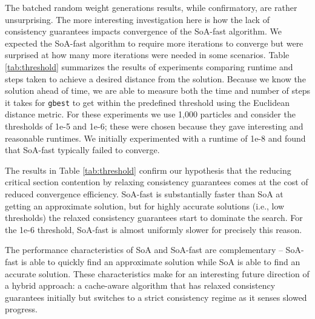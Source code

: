 The batched random weight generations results, while confirmatory, are rather
unsurprising. The more interesting investigation here is how the lack of
consistency guarantees impacts convergence of the SoA-fast algorithm. We
expected the SoA-fast algorithm to require more iterations to converge
but were surprised at how many more iterations were needed in some
scenarios. Table \ref{tab:threshold} summarizes the results of experiments
comparing runtime and steps taken to achieve a desired distance from the
solution. Because we know the solution ahead of time, we are able to measure
both the time and number of steps it
takes for \texttt{gbest} to get within the predefined threshold using the
Euclidean distance metric. For these experiments we use 1,000 particles and
consider the thresholds of 1e-5 and 1e-6; these were chosen because they
gave interesting and reasonable runtimes. We initially experimented with a
runtime of 1e-8 and found that SoA-fast typically failed to converge.

The results in Table \ref{tab:threshold} confirm our hypothesis that the
reducing critical section contention by relaxing consistency
guarantees comes at the cost of reduced convergence efficiency. SoA-fast is
substantially faster than SoA at getting an approximate solution, but for highly
accurate solutions (i.e., low thresholds) the relaxed consistency guarantees
start to dominate the search. For the 1e-6 threshold, SoA-fast is almost
uniformly slower for precisely this reason.

The performance characteristics of SoA and SoA-fast are complementary --
SoA-fast is able to quickly find an approximate solution while SoA is able to
find an accurate solution. These characteristics make for an interesting future
direction of a hybrid approach: a cache-aware algorithm that has relaxed
consistency guarantees initially but switches to a strict consistency regime as
it senses slowed progress.




